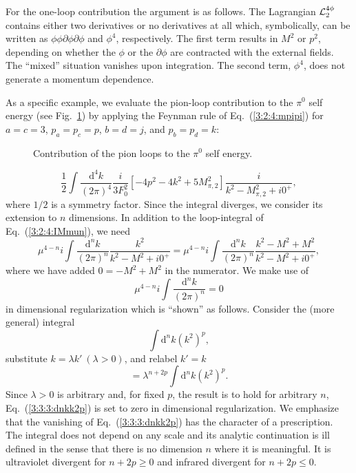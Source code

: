 \documentclass[twoside,12pt]{article}
\begin{document}
   For the one-loop contribution the argument is as follows.
   The Lagrangian ${\cal L}_2^{4\phi}$ contains either two derivatives
or no derivatives at all which, symbolically, can be written as
$\phi\phi\partial\phi\partial\phi$ and $\phi^4$, respectively.
   The first term results in $M^2$ or $p^2$, depending on whether the
$\phi$ or the $\partial \phi$ are contracted with the external fields.
   The ``mixed'' situation vanishes upon integration.
   The second term, $\phi^4$, does not generate a momentum dependence.

   As a specific example, we evaluate the pion-loop contribution to the
$\pi^0$ self energy (see Fig.\ \ref{4:9:pi0seloop}) by applying
the Feynman rule of Eq.~(\ref{3:2:4:mpipi})
for $a=c=3$, $p_a=p_c=p$, $b=d=j$, and $p_b=p_d=k$:
\begin{figure}
\begin{center}
\caption{\label{4:9:pi0seloop} Contribution of the pion loops to
the $\pi^0$ self energy.}
\end{center}
\end{figure}
\begin{displaymath}
\label{3:3:3:diag}
\frac{1}{2}\int \frac{\mbox{d}^4k}{(2\pi)^4}\frac{i}{3F_0^2}
[-4p^2-4k^2+5 M^2_{\pi,2}]
\frac{i}{k^2-M_{\pi,2}^2+i0^+},
\end{displaymath}
   where $1/2$ is a symmetry factor.
   Since the integral diverges, we consider its extension to $n$ dimensions.
   In addition to the loop-integral of Eq.\ (\ref{3:2:4:IMmun}),
we need
\begin{displaymath}
\mu^{4-n}i\int \frac{\mbox{d}^n k}{(2\pi)^n}\frac{k^2}{k^2-M^2+i0^+}=
\mu^{4-n}i\int \frac{\mbox{d}^n k}{(2\pi)^n}\frac{k^2-M^2+M^2}{k^2-M^2+i0^+},
\end{displaymath}
   where we have added $0=-M^2+M^2$ in the numerator.
We make use of
$$\mu^{4-n}i\int \frac{\mbox{d}^n k}{(2\pi)^n}=0$$
in dimensional regularization which is ``shown'' as follows.
   Consider the (more general) integral
\begin{equation}
\label{3:3:3:dnkk2p}
\int \mbox{d}^n k (k^2)^p,
\end{equation}
substitute $k=\lambda k'\ (\lambda > 0)$, and relabel $k'=k$
\begin{displaymath}
=\lambda^{n+2p}\int \mbox{d}^n k (k^2)^p.
\end{displaymath}
   Since $\lambda>0$ is arbitrary and, for fixed $p$, the result
is to hold for arbitrary $n$, Eq.\ (\ref{3:3:3:dnkk2p})
is set to zero in dimensional regularization.
   We emphasize that the vanishing of Eq.\ (\ref{3:3:3:dnkk2p}) has
the character of a prescription.
   The integral does not depend on any scale and its analytic continuation
is ill defined in the sense that there is no dimension $n$ where it is
meaningful.
  It is ultraviolet divergent for $n+2p\geq 0$ and infrared divergent
for $n+2p\leq 0$.
\end{document}
